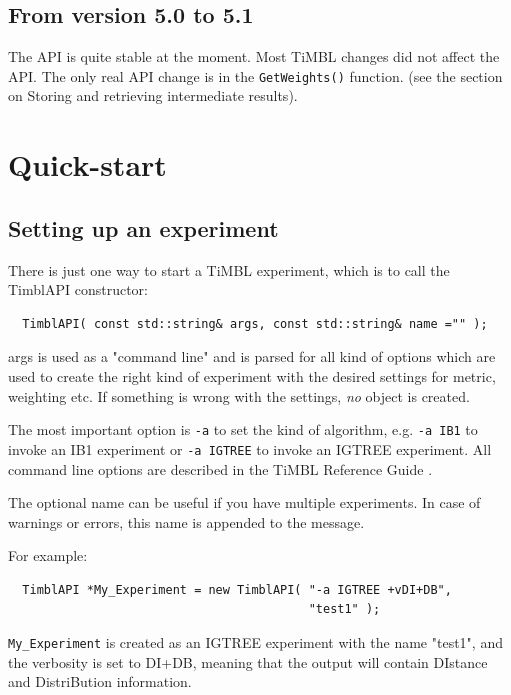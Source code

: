 \documentclass{report}
\begin{document}
\section{From version 5.0 to 5.1}

The API is quite stable at the moment. Most TiMBL changes did not
affect the API. The only real API change is in the {\tt GetWeights()}
function. (see the section on Storing and retrieving intermediate
results).

\chapter{Quick-start}
\section{Setting up an experiment}

There is just one way to start a TiMBL experiment, which is to call
the TimblAPI constructor:

\begin{footnotesize}
\begin{verbatim}
  TimblAPI( const std::string& args, const std::string& name ="" );
\end{verbatim}
\end{footnotesize}

args is used as a "command line" and is parsed for all kind of options
which are used to create the right kind of experiment with the desired
settings for metric, weighting etc. If something is wrong with the
settings, {\em no}\/ object is created.

The most important option is {\tt -a}  to set the kind of algorithm,
e.g. {\tt -a IB1} to invoke an IB1 experiment or {\tt -a IGTREE} to invoke an IGTREE
experiment. All command line options are described in the TiMBL
Reference Guide \cite{Daelemans+26}.

The optional name can be useful if you have multiple experiments.
In case of warnings or errors, this name is appended to the message.

For example:

\begin{footnotesize}
\begin{verbatim}
  TimblAPI *My_Experiment = new TimblAPI( "-a IGTREE +vDI+DB",
                                          "test1" );
\end{verbatim}
\end{footnotesize}

{\tt My\_Experiment} is created as an IGTREE experiment with the name
"test1", and the verbosity is set to DI+DB, meaning that the output
will contain DIstance and DistriBution information.
\end{document}
